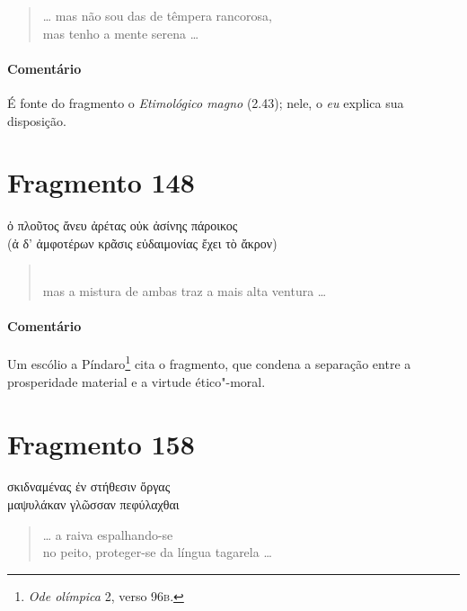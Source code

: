 \begin{verse}
\ldots{} mas não sou das de têmpera rancorosa,\\
mas tenho a mente serena \ldots{}
\end{verse}

\medskip

{\paragraph{Comentário} É fonte do fragmento o \emph{Etimológico magno} (2.43); nele, o \emph{eu} explica sua disposição.}


\section{Fragmento 148}

\begin{gkverse}
ὀ πλοῦτος ἄνευ ἀρέτας οὐκ ἀσίνης πάροικος\\
(ἀ δ’ ἀμφοτέρων κρᾶσις \dagger{}εὐδαιμονίας ἔχει τὸ ἄκρον\dagger{})
\end{gkverse}

\begin{verse}
\\
mas a mistura de ambas traz a mais alta ventura \ldots{}
\end{verse}

\medskip

{\paragraph{Comentário} Um escólio a Píndaro\footnote{\emph{Ode olímpica} 2, verso 96\textsc{b}.} cita o fragmento,
que condena a separação entre a prosperidade material e a virtude ético"-moral.}

\section{Fragmento 158}

\begin{gkverse}
σκιδναμένας ἐν στήθεσιν ὄργας\\
μαψυλάκαν γλῶσσαν πεφύλαχθαι
\end{gkverse}

\begin{verse}
\ldots{} a raiva espalhando-se\\
no peito, proteger-se da língua tagarela \ldots{}
\end{verse}

